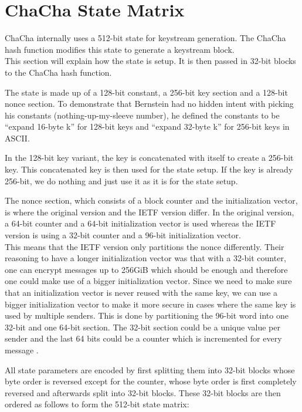 \section{ChaCha State Matrix}
\label{sec:chacha.matrix}

ChaCha internally uses a 512-bit state for keystream generation. The ChaCha hash function modifies this state to generate a keystream block. \\
This section will explain how the state is setup. It is then passed in 32-bit blocks to the ChaCha hash function.

The state is made up of a 128-bit constant, a 256-bit key section and a 128-bit nonce section. To demonstrate that Bernstein had no hidden intent with picking his constants (nothing-up-my-sleeve number), he defined the constants to be ``expand 16-byte k'' for 128-bit keys and ``expand 32-byte k'' for 256-bit keys in ASCII.

In the 128-bit key variant, the key is concatenated with itself to create a 256-bit key. This concatenated key is then used for the state setup. If the key is already 256-bit, we do nothing and just use it as it is for the state setup.

The nonce section, which consists of a block counter and the initialization vector, is where the original version and the IETF version differ. In the original version, a 64-bit counter and a 64-bit initialization vector is used whereas the IETF version is using a 32-bit counter and a 96-bit initialization vector. \\
This means that the IETF version only partitions the nonce differently. Their reasoning to have a longer initialization vector was that with a 32-bit counter, one can encrypt messages up to 256GiB which should be enough and therefore one could make use of a bigger initialization vector. Since we need to make sure that an initialization vector is never reused with the same key, we can use a bigger initialization vector to make it more secure in cases where the same key is used by multiple senders. This is done by partitioning the 96-bit word into one 32-bit and one 64-bit section. The 32-bit section could be a unique value per sender and the last 64 bits could be a counter which is incremented for every message \cite{rfc8439}.

All state parameters are encoded by first splitting them into 32-bit blocks whose byte order is reversed except for the counter, whose byte order is first completely reversed and afterwards split into 32-bit blocks. These 32-bit blocks are then ordered as follows to form the 512-bit state matrix:

